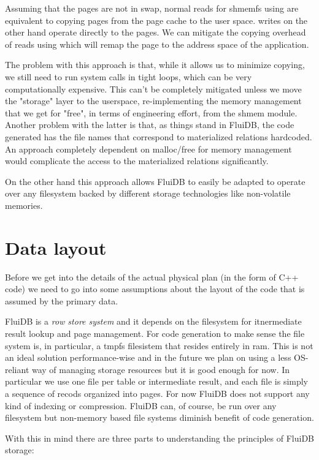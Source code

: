 Assuming that the pages are not in swap, normal reads for shmemfs
using  are equivalent to copying pages from the page cache to
the user space.  writes on the other hand operate directly to
the pages. We can mitigate the copying overhead of reads using 
which will remap the page to the address space of the application.

The problem with this approach is that, while it allows us to minimize
copying, we still need to run system calls in tight loops, which can
be very computationally expensive. This can't be completely mitigated
unless we move the "storage" layer to the userspace, re-implementing
the memory management that we get for "free", in terms of engineering
effort, from the shmem module. Another problem with the latter is
that, as things stand in FluiDB, the code generated has the file names
that correspond to materialized relations hardcoded. An approach
completely dependent on malloc/free for memory management would
complicate the access to the materialized relations significantly.

On the other hand this approach allows FluiDB to easily be adapted to
operate over any filesystem backed by different storage technologies
like non-volatile memories.

\section{Data layout}

Before we get into the details of the actual physical plan (in the
form of C++ code) we need to go into some assumptions about the layout
of the code that is assumed by the primary data.

FluiDB is a \emph{row store system} and it depends on the filesystem for
itnermediate result lookup and page management. For code generation to
make sense the file system is, in particular, a tmpfs filesistem that
resides entirely in ram. This is not an ideal solution
performance-wise and in the future we plan on using a less OS-reliant
way of managing storage resources but it is good enough for now. In
particular we use one file per table or intermediate result, and each
file is simply a sequence of recods organized into pages. For now
FluiDB does not support any kind of indexing or compression. FluiDB
can, of course, be run over any filesystem but non-memory based file
systems diminish benefit of code generation.

With this in mind there are three parts to understanding the
principles of FluiDB storage:

